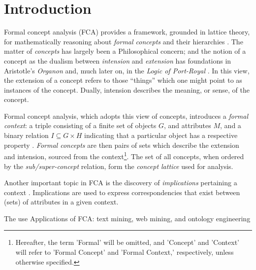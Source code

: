 \section{Introduction}
\label{section: introduction}

Formal concept analysis (FCA) provides a framework, grounded in lattice theory, for mathematically reasoning about \textit{formal concepts} and their hierarchies \cite{ganter1999formal,ganter2016conceptual,rudolph2007relational}. The matter of \textit{concepts} has largely been a Philosophical concern; and the notion of a concept as the dualism between \textit{intension} and \textit{extension} has foundations in Aristotle's \textit{Organon} and, much later on, in the \textit{Logic of Port-Royal} \cite{rudolph2007relational,castonguay2012meaning}. In this view, the extension of a concept refers to those ``things'' which one might point to as instances of the concept. Dually, intension describes the meaning, or sense, of the concept.

Formal concept analysis, which adopts this view of concepts, introduces a \textit{formal context}: a triple consisting of a finite set of objects $G$, and attributes $M$, and a binary relation $I \subseteq G\times H$ indicating that a particular object has a respective property \cite{ganter1999formal,ganter2016conceptual}. \textit{Formal concepts} are then pairs of sets which describe the extension and intension, sourced from the context\footnote{Hereafter, the term 'Formal' will be omitted, and 'Concept' and 'Context' will refer to 'Formal Concept' and 'Formal Context,' respectively, unless otherwise specified.}. The set of all concepts, when ordered by the \textit{sub/super-concept} relation, form the \textit{concept lattice} used for analysis.

Another important topic in FCA is the discovery of \textit{implications} pertaining a context \cite{rudolph2007relational,ganter1999formal}. Implications are used to express correspondencies that exist between (sets) of attributes in a given context.

The use
Applications of FCA: text mining, web mining, and ontology engineering